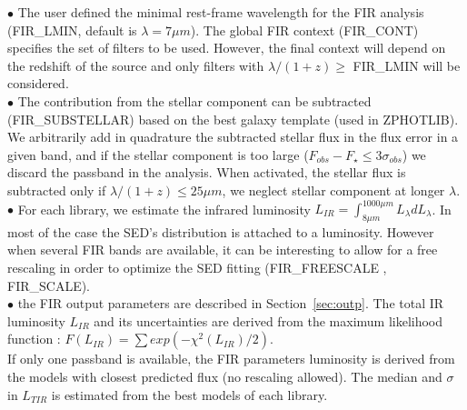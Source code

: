 \documentclass[12pt]{article}
\begin{document}
\noindent $\bullet$  The user defined the minimal rest-frame wavelength for the FIR analysis
 (FIR\_LMIN, default is  $\lambda=7\mu m$). 
 The global FIR context (FIR\_CONT) specifies the set of filters to be used. 
 However, the final context will depend on the redshift of the source and only 
 filters with  $\lambda/(1+z) \ge$ FIR\_LMIN will be considered.  \\
%
 $\bullet$ The contribution from the stellar component can be subtracted (FIR\_SUBSTELLAR)
  based on the best galaxy template  (used in ZPHOTLIB).  
  We arbitrarily add in quadrature the subtracted stellar flux in the flux error in a given band,
  and if the stellar component is too large ($F_{obs}-F_{\star}\le 3\sigma_{obs}$) we discard 
  the passband in the analysis. 
  When activated, the stellar flux is subtracted only if $\lambda/(1+z)\le 25\mu m$,
  we neglect stellar component at longer $\lambda$. \\
% 
$\bullet$  For each  library, we estimate the infrared luminosity
 $L_{IR}=\int_{8\mu m}^{1000\mu m} L_{\lambda} dL_{\lambda}$.  
 In most of the case the SED's distribution  is attached to a luminosity.
  However when several FIR bands are available, it can be interesting to allow for a free
  rescaling in order to optimize the SED fitting (FIR\_FREESCALE , FIR\_SCALE). \\
%
$\bullet$ the FIR output parameters are described in Section~\ref{sec:outp}. 
 The total IR luminosity $L_{IR}$ and its uncertainties are derived from the
 maximum likelihood  function : $F(L_{IR})=\sum exp(-\chi^2(L_{IR})/2)$.  \\
 If only one passband is available,  the FIR parameters luminosity is 
 derived from the models with closest predicted flux (no rescaling allowed).
 The median and $\sigma$ in $L_{TIR}$ is estimated from the best models 
 of each library.      
\end{document}
